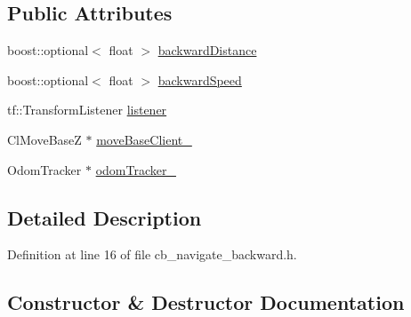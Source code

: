 \subsection*{Public Attributes}
\begin{DoxyCompactItemize}
\item 
boost\+::optional$<$ float $>$ \hyperlink{classsm__dance__bot_1_1move__base__z__client_1_1CbNavigateBackwards_a4067b6379c6f1c8e7d6d90a1206e98f8}{backward\+Distance}
\item 
boost\+::optional$<$ float $>$ \hyperlink{classsm__dance__bot_1_1move__base__z__client_1_1CbNavigateBackwards_a175ffec2b79c411ee1b88cff62ed37e9}{backward\+Speed}
\item 
tf\+::\+Transform\+Listener \hyperlink{classsm__dance__bot_1_1move__base__z__client_1_1CbNavigateBackwards_aeaaa632b142737c65bc87587aa02a3bf}{listener}
\item 
Cl\+Move\+BaseZ $\ast$ \hyperlink{classsm__dance__bot_1_1move__base__z__client_1_1CbNavigateBackwards_a566448c392e347b21c51126572421603}{move\+Base\+Client\+\_\+}
\item 
Odom\+Tracker $\ast$ \hyperlink{classsm__dance__bot_1_1move__base__z__client_1_1CbNavigateBackwards_abd9c4cd5af4af4da2713a77dcb599a5f}{odom\+Tracker\+\_\+}
\end{DoxyCompactItemize}


\subsection{Detailed Description}


Definition at line 16 of file cb\+\_\+navigate\+\_\+backward.\+h.



\subsection{Constructor \& Destructor Documentation}
